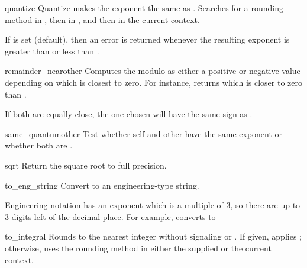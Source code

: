 \begin{methoddesc}{quantize}
  {}
  Quantize makes the exponent the same as .  Searches for a
  rounding method in , then in , and then
  in the current context.

  If  is set (default), then an error is returned whenever
  the resulting exponent is greater than  or less than
  .
\end{methoddesc} 

\begin{methoddesc}{remainder_near}{other}
  Computes the modulo as either a positive or negative value depending
  on which is closest to zero.  For instance,
   returns 
  which is closer to zero than .

  If both are equally close, the one chosen will have the same sign
  as .
\end{methoddesc}  

\begin{methoddesc}{same_quantum}{other}
  Test whether self and other have the same exponent or whether both
  are .
\end{methoddesc}

\begin{methoddesc}{sqrt}{}
  Return the square root to full precision.
\end{methoddesc}                    
 
\begin{methoddesc}{to_eng_string}{}
  Convert to an engineering-type string.

  Engineering notation has an exponent which is a multiple of 3, so there
  are up to 3 digits left of the decimal place.  For example, converts
   to 
\end{methoddesc}  

\begin{methoddesc}{to_integral}{}                   
  Rounds to the nearest integer without signaling 
  or .  If given, applies ; otherwise,
  uses the rounding method in either the supplied  or the
  current context.
\end{methoddesc} 



